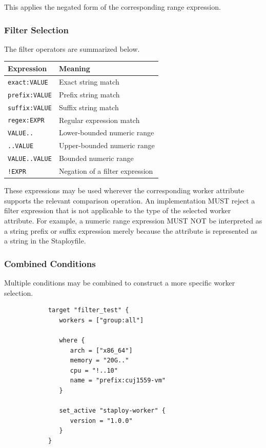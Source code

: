 \documentclass[11pt,a4paper]{article}
\begin{document}
    This applies the negated form of the corresponding range expression.

    \subsubsection{Filter Selection}

    The filter operators are summarized below.

    \begin{center}
        \begin{tabular}{ll}
            \textbf{Expression}   & \textbf{Meaning}                \\
            \hline
            \texttt{exact:VALUE}  & Exact string match              \\
            \texttt{prefix:VALUE} & Prefix string match             \\
            \texttt{suffix:VALUE} & Suffix string match             \\
            \texttt{regex:EXPR}   & Regular expression match        \\
            \texttt{VALUE..}      & Lower-bounded numeric range     \\
            \texttt{..VALUE}      & Upper-bounded numeric range     \\
            \texttt{VALUE..VALUE} & Bounded numeric range           \\
            \texttt{!EXPR}        & Negation of a filter expression \\
        \end{tabular}
    \end{center}

    These expressions may be used wherever the corresponding worker attribute supports the relevant comparison operation.
    An implementation MUST reject a filter expression that is not applicable to the type of the selected worker attribute.
    For example, a numeric range expression MUST NOT be interpreted as a string prefix or suffix expression merely because the attribute is represented as a string in the Staployfile.

    \subsubsection{Combined Conditions}

    Multiple conditions may be combined to construct a more specific worker selection.

    \begin{center}
        \begin{verbatim}
            target "filter_test" {
               workers = ["group:all"]

               where {
                  arch = ["x86_64"]
                  memory = "20G.."
                  cpu = "!..10"
                  name = "prefix:cuj1559-vm"
               }

               set_active "staploy-worker" {
                  version = "1.0.0"
               }
            }
        \end{verbatim}
    \end{center}
\end{document}
